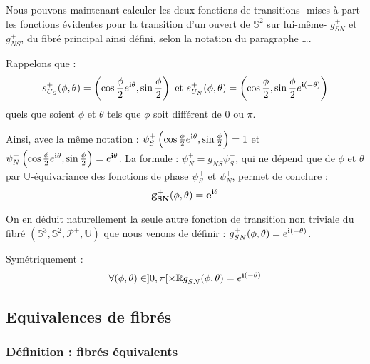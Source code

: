 \begin{exem}
Nous pouvons maintenant calculer les deux fonctions de transitions -mises \`a part les fonctions \'evidentes pour la transition d'un ouvert de $\mathbb{S}^2$ sur lui-m\^eme- %
$g_{SN}^+$ et $g_{NS}^+$, du fibr\'e principal ainsi d\'efini, selon la notation du paragraphe \dots .

\par
Rappelons que : \[\se{S}{+}(\phi ,\theta )=\left(\cos\frac{\phi}{2}\ec{\theta},\sin\frac{\phi}{2}\right)\text{ et }%
\se{N}{+}(\phi ,\theta )=\left(\cos\frac{\phi}{2},\sin\frac{\phi}{2}\ec{(-\theta)}\right)\]
quels que soient $\phi$ et $\theta$ tels que $\phi$ soit diff\'erent de $0$ ou $\pi$.

\par
Ainsi, avec la m\^eme notation : $\psi_S^+\left(\cos\frac{\phi}{2}e^{\mathbf{i}\theta},\sin\frac{\phi}{2}\right)=1$ et $\psi_N^+\left(\cos\frac{\phi}{2}e^{\mathbf{i}\theta},\sin\frac{\phi}{2}\right)=e^{\mathbf{i}\theta}$. %
La formule : $\psi_N^+=g_{NS}^+\psi_S^+$, qui ne d\'epend que de $\phi$ et $\theta$ par $\mathbb{U}$-\'equivariance des fonctions de phase $\psi_S^+$ et $\psi_N^+$, %
permet de conclure :\[\mathbf{g_{SN}^+(\phi ,\theta )=e^{\mathbf{i}\theta}}\]

\par
On en d\'eduit naturellement la seule autre fonction de transition non triviale du fibr\'e $(\mathbb{S}^3,\mathbb{S}^2,\mathcal{P}^+,\mathbb{U})$ que nous venons de d\'efinir : %
$g_{SN}^+(\phi ,\theta )=e^{\mathbf{i}(-\theta )}$.

\etoile
Sym\'etriquement :
\[\forall (\phi,\theta)\in ]0,\pi [\times\mathbb{R}g_{SN}^-(\phi,\theta)=e^{\mathbf{i}(-\theta)}\]
\end{exem}


\subsection{Equivalences de fibr\'es}

\subsubsection{D\'efinition : fibr\'es \'equivalents}

